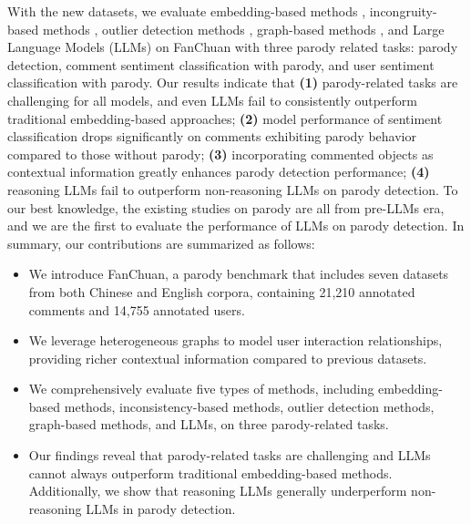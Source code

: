 
With the new datasets, we evaluate embedding-based methods \citep{RoBERTa}, incongruity-based methods \citep{SarcPrompt}, outlier detection methods \citep{IsolationForest}, graph-based methods \citep{GCN}, and Large Language Models (LLMs) \citep{GPT4} on FanChuan with three parody related tasks: parody detection, comment sentiment classification with parody, and user sentiment classification with parody. Our results indicate that \textbf{(1)} parody-related tasks are challenging for all models, and even LLMs fail to consistently outperform traditional embedding-based approaches; \textbf{(2)} model performance of sentiment classification drops significantly on comments exhibiting parody behavior compared to those without parody; \textbf{(3)} incorporating commented objects as contextual information greatly enhances parody detection performance; \textbf{(4)} reasoning LLMs fail to outperform non-reasoning LLMs on parody detection. To our best knowledge, the existing studies on parody\citep{parody_dataset,willett2009parodic} are all from pre-LLMs era, and we are the first to evaluate the performance of LLMs on parody detection. In summary, our contributions are summarized as follows:

\begin{itemize}
    \item We introduce FanChuan, a parody benchmark that includes seven datasets from both Chinese and English corpora, containing 21,210 annotated comments and 14,755 annotated users.
    \item We leverage heterogeneous graphs to model user interaction relationships, providing richer contextual information compared to previous datasets.
    \item We comprehensively evaluate five types of methods, including embedding-based methods, inconsistency-based methods, outlier detection methods, graph-based methods, and LLMs, on three parody-related tasks.
    \item Our findings reveal that parody-related tasks are challenging and LLMs cannot always outperform traditional embedding-based methods. Additionally, we show that reasoning LLMs generally underperform non-reasoning LLMs in parody detection.
\end{itemize}





